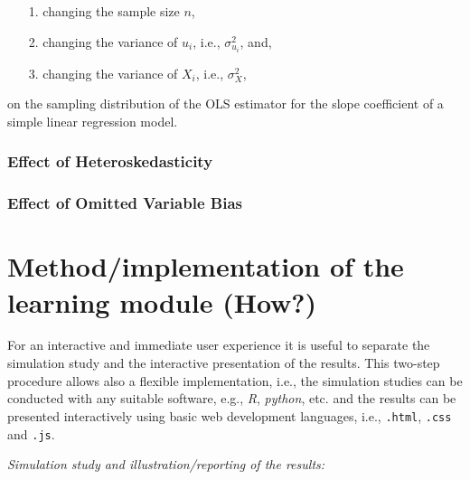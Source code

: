 \documentclass{article}
\begin{document}
\begin{itemize}
	\item[1.] changing the sample size $n$,
	\item[2.] changing the variance of $u_{i}$, i.e., $\sigma_{u_{i}}^{2}$, and,
	\item[3.] changing the variance of $X_{i}$, i.e., $\sigma_{X}^{2}$, 
\end{itemize}

on the sampling distribution of the OLS estimator for the slope coefficient of a simple linear regression model.

\subsubsection{Effect of Heteroskedasticity}


\subsubsection{Effect of Omitted Variable Bias}






\section{Method/implementation of the learning module (How?)}

For an interactive and immediate user experience it is useful to separate the simulation study and the interactive presentation of the results. 
%
This two-step procedure allows also a flexible implementation, i.e., the simulation studies can be conducted with any suitable software, e.g., \emph{R}, \emph{python}, etc. and the results can be presented interactively using basic web development languages, i.e., \texttt{.html}, \texttt{.css} and \texttt{.js}.

\emph{Simulation study and illustration/reporting of the results:}
\end{document}
